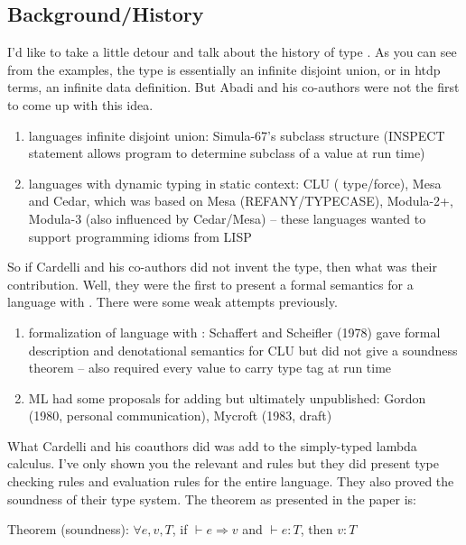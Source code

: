 \documentclass[12pt]{article}	%
\begin{document}
\subsection*{Background/History}
I'd like to take a little detour and talk about the history of type \Dynamic. As you can see from the examples, the type \Dynamic is essentially an infinite disjoint union, or in htdp terms, an infinite data definition. But Abadi and his co-authors were not the first to come up with this idea.

\begin{enumerate}
	\item languages infinite disjoint union: Simula-67's subclass structure (INSPECT statement allows program to determine subclass of a value at run time)
	\item languages with dynamic typing in static context: CLU ( type/force), Mesa and Cedar, which was based on Mesa (REFANY/TYPECASE), Modula-2+, Modula-3 (also influenced by Cedar/Mesa) -- these languages wanted to support programming idioms from LISP
\end{enumerate}

So if Cardelli and his co-authors did not invent the \Dynamic type, then what was their contribution. Well, they were the first to present a formal semantics for a language with \Dynamic. There were some weak attempts previously.

\begin{enumerate}

	\item formalization of language with \Dynamic: Schaffert and Scheifler (1978) gave formal description and denotational semantics for CLU but did not give a soundness theorem -- also required every value to carry type tag at run time
	\item ML had some proposals for adding \Dynamic but ultimately unpublished: Gordon (1980, personal communication), Mycroft (1983, draft)
\end{enumerate}

What Cardelli and his coauthors did was add \Dynamic to the simply-typed lambda calculus. I've only shown you the relevant \dynamic and \typecase rules but they did present type checking rules and evaluation rules for the entire language. They also proved the soundness of their type system. The theorem as presented in the paper is:

Theorem (soundness): $\forall e, v, T$, if $\vdash e \Rightarrow v$ and $\vdash e:T$, then $v:T$\\
\end{document}

